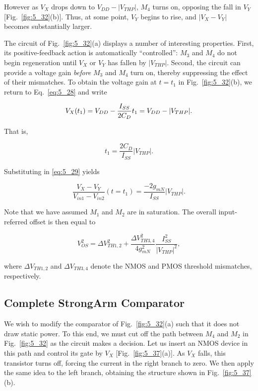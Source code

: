 However as $V_X$ drops down to $V_{DD} - |V_{THP}|$, $M_4$ turns on, opposing the fall
in $V_Y$ [Fig.~\ref{fig:5_32}(b)]. Thus, at some point, $V_Y$ begins to rise,
and $|V_X - V_Y|$ becomes substantially larger.


The circuit of Fig.~\ref{fig:5_32}(a) displays a number of interesting
properties. First, its positive-feedback action is automatically
``controlled'': $M_3$ and $M_4$ do not begin regeneration until $V_X$ or $V_Y$
has fallen by $|V_{THP}|$. Second, the circuit can provide a voltage gain
\emph{before} $M_3$ and $M_4$ turn on, thereby suppressing the effect of their
mismatches. To obtain the voltage gain at $t = t_1$ in Fig.~\ref{fig:5_32}(b),
we return to Eq.~\eqref{eq:5_28} and write

\begin{equation}
	V_X(t_1) = V_{DD} - \frac{I_{SS}}{2 C_D} t_1 \label{eq:5_35} \\
	= V_{DD} - |V_{THP}|.
\end{equation}

That is,

\begin{equation}
	t_1 = \frac{2 C_D}{I_{SS}} |V_{THP}|.
	\label{eq:5_37}
\end{equation}

Substituting in \eqref{eq:5_29} yields

\begin{equation}
	\frac{V_X - V_Y}{V_{in1} - V_{in2}} (t = t_1) = \frac{-2 g_{mN}}{I_{SS}} |V_{THP}|.
	\label{eq:5_38}
\end{equation}

Note that we have assumed $M_1$ and $M_2$ are in saturation. The overall
input-referred offset is then equal to

\begin{equation}
	V_{OS}^2 = \Delta V_{TH1,2}^2 + \frac{\Delta V_{TH3,4}^2}{4 g_{mN}^2}
	\frac{I_{SS}^2}{|V_{THP}|^2},
	\label{eq:5_39}
\end{equation}

where $\Delta V_{TH1,2}$ and $\Delta V_{TH3,4}$ denote the NMOS and PMOS
threshold mismatches, respectively.

\subsection{Complete StrongArm Comparator}

We wish to modify the comparator of Fig.~\ref{fig:5_32}(a) such that it does
not draw static power. To this end, we must cut off the path between $M_4$ and
$M_2$ in Fig.~\ref{fig:5_32} as the circuit makes a decision. Let us insert an
NMOS device in this path and control its gate by $V_X$ [Fig.~\ref{fig:5_37}(a)].
As $V_X$ falls, this transistor turns off, forcing the current in the right
branch to zero. We then apply the same idea to the left branch, obtaining the
structure shown in Fig.~\ref{fig:5_37}(b).

